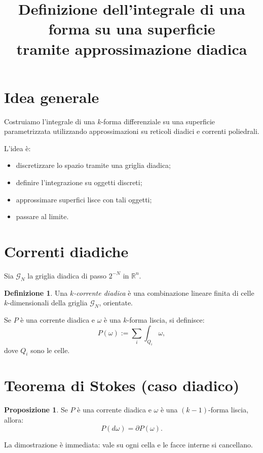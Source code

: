 \documentclass[a4paper,11pt]{article}
\title{Definizione dell'integrale di una forma su una superficie\\
tramite approssimazione diadica}
\author{}
\date{}
\theoremstyle{definition}
\newtheorem{definition}{Definizione}
\newtheorem{proposition}{Proposizione}
\begin{document}
\maketitle

\section{Idea generale}

Costruiamo l'integrale di una $k$-forma differenziale su una superficie parametrizzata
utilizzando approssimazioni su reticoli diadici e correnti poliedrali.

L'idea è:
\begin{itemize}
\item discretizzare lo spazio tramite una griglia diadica;
\item definire l'integrazione su oggetti discreti;
\item approssimare superfici lisce con tali oggetti;
\item passare al limite.
\end{itemize}

\section{Correnti diadiche}

Sia $\mathcal{G}_N$ la griglia diadica di passo $2^{-N}$ in $\mathbb{R}^n$.

\begin{definition}
Una \emph{$k$-corrente diadica} è una combinazione lineare finita di celle
$k$-dimensionali della griglia $\mathcal{G}_N$, orientate.
\end{definition}

Se $P$ è una corrente diadica e $\omega$ è una $k$-forma liscia, si definisce:
\[
P(\omega) := \sum_i \int_{Q_i} \omega,
\]
dove $Q_i$ sono le celle.

\section{Teorema di Stokes (caso diadico)}

\begin{proposition}
Se $P$ è una corrente diadica e $\omega$ è una $(k-1)$-forma liscia, allora:
\[
P(d\omega) = \partial P(\omega).
\]
\end{proposition}

\noindent
La dimostrazione è immediata: vale su ogni cella e le facce interne si cancellano.
\end{document}
